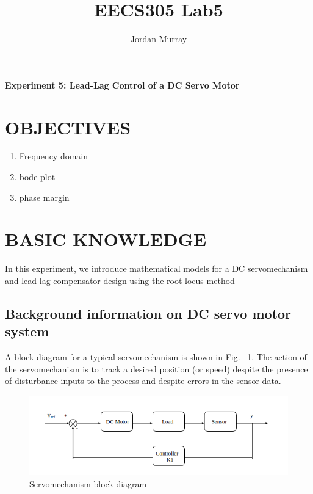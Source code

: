 \documentclass[11pt,a4paper]{article}
\author{Jordan Murray}
\title{EECS305 Lab5}
\begin{document}
\begin{center}
\fontsize{24}{12}\selectfont
\textbf{Experiment 5: Lead-Lag Control of a DC Servo Motor}
\end{center}
\section{OBJECTIVES}

\begin{enumerate}
\item Frequency domain

\item bode plot

\item phase margin

\end{enumerate}


\section{BASIC KNOWLEDGE}
In this experiment, we introduce mathematical models for a DC servomechanism and lead-lag compensator design using the root-locus method

\subsection{Background information on DC servo motor system}

A block diagram for a typical servomechanism is shown in Fig. ~\ref{fig:servoblock}.  The action of the servomechanism is to track a desired position (or speed) despite the 
presence of disturbance inputs to the process and despite errors in the 
sensor data.

\begin{figure}[here]
\includegraphics[width=\textwidth]{imglab/servoblockdiagram.png}
\caption{Servomechanism block diagram}
\label{fig:servoblock}
\end{figure}
\end{document}
